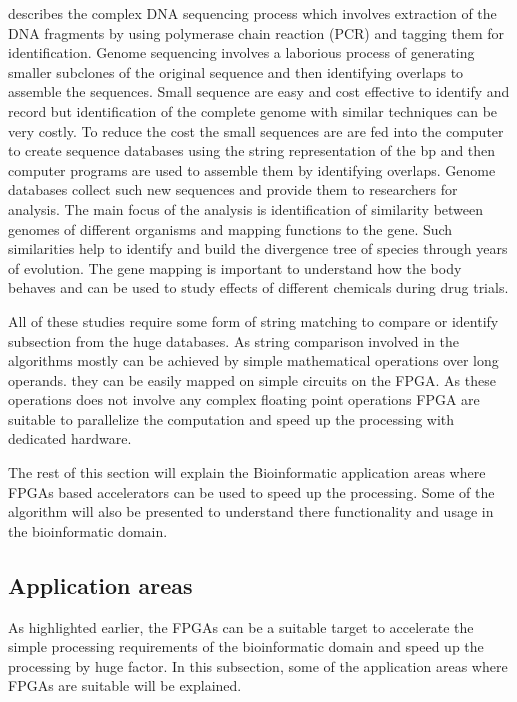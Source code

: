 \documentclass[12pt,twoside]{article}
\begin{document}
\textcite[chapter 2]{mount_bioinformatics:_2004} describes the complex DNA sequencing process which involves
extraction of the DNA fragments by using polymerase chain reaction (PCR) and tagging them for identification.
Genome sequencing involves a laborious process of generating smaller subclones of the original sequence and
then identifying overlaps to assemble the sequences. Small sequence are easy and cost effective to identify
and record but identification of the complete genome with similar techniques can be very costly. To reduce
the cost the small sequences are are fed into the computer to create sequence databases using the string
representation of the bp and then computer programs are used to assemble them by identifying overlaps.
Genome databases collect such new sequences and provide them to researchers for analysis. The main
focus of the analysis is identification of similarity between genomes of different organisms and mapping
functions to the gene. Such similarities help to identify and build the divergence tree of species
through years of evolution. The gene mapping is important to understand how the body behaves and can
be used to study effects of different chemicals during drug trials.

All of these studies require some form of string matching to compare or identify subsection from the huge
databases. As string comparison involved in the algorithms mostly can be achieved by simple mathematical
operations over long operands. they can be easily mapped on simple circuits on the FPGA. As these
operations does not involve any complex floating point operations FPGA are suitable to parallelize the
computation and speed up the processing with dedicated hardware.

The rest of this section will explain the Bioinformatic application areas where FPGAs based accelerators
can be used to speed up the processing. Some of the algorithm will also be presented to understand there
functionality and usage in the bioinformatic domain.

\subsection{Application areas}

As highlighted earlier, the FPGAs can be a suitable target to accelerate the simple processing requirements
of the bioinformatic domain and speed up the processing by huge factor. In this subsection, some of the
application areas where FPGAs are suitable will be explained.
\end{document}
